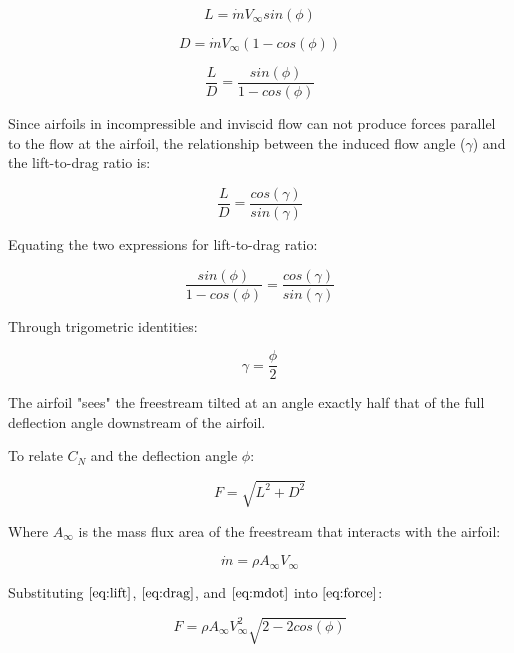 \begin{equation}
\label{eq:lift}
    L = \dot{m} V_\infty sin(\phi)
\end{equation}

\begin{equation}
D = \dot{m} V_\infty (1 - cos(\phi))
\label{eq:drag}
\end{equation}

\begin{equation}
\frac{L}{D} = \frac{sin(\phi)}{1 - cos(\phi)}
\end{equation}

Since airfoils in incompressible and inviscid flow can not produce forces parallel to the flow at the airfoil, the relationship between the induced flow angle (\(\gamma\)) and the lift-to-drag ratio is:

\begin{equation}
\frac{L}{D} = \frac{cos(\gamma)}{sin(\gamma)}
\end{equation}

Equating the two expressions for lift-to-drag ratio:

\begin{equation}
\frac{sin(\phi)}{1 - cos(\phi)}
    = \frac{cos(\gamma)}{sin(\gamma)}
\end{equation}

Through trigometric identities:

\begin{equation}
    \gamma = \frac{\phi}{2}
\end{equation}

The airfoil "sees" the freestream tilted at an angle exactly half that of the full deflection angle downstream of the airfoil.

To relate \(C_N\) and the deflection angle \(\phi\):

\begin{equation}
\label{eq:force}
    F = \sqrt{L^2 + D^2}
\end{equation}

Where \(A_\infty\) is the mass flux area of the freestream that interacts with the airfoil:

\begin{equation}
\label{eq:mdot}
    \dot{m} = \rho A_\infty V_\infty
\end{equation}

Substituting \(\eqref{eq:lift}\), \(\eqref{eq:drag}\), and \(\eqref{eq:mdot}\) into \(\eqref{eq:force}\):

\begin{equation}
    F = \rho A_\infty V_\infty^2 \sqrt{2 - 2 cos(\phi)}
\end{equation}

